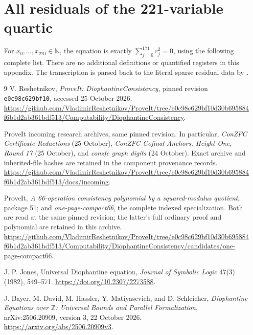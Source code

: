 \documentclass[11pt,letterpaper]{article}
\theoremstyle{remark}\newtheorem{remark}[theorem]{Remark}
\newcommand{\N}{\mathbb N}
\newcommand{\Z}{\mathbb Z}
\newcommand{\file}[1]{\texttt{\small\detokenize{#1}}}
\begin{document}
\begingroup\small

\endgroup

\clearpage
\section{All residuals of the 221-variable quartic}
\label{app:residuals}

For $x_0,\ldots,x_{220}\in\N$, the equation is exactly
$\sum_{j=0}^{171}r_j^2=0$, using the following complete list.
There are no additional definitions or quantified registers in this appendix.
The transcription is parsed back to the literal sparse residual data by
\file{natural/render.py --check}.
\begingroup\small
\setlength{\abovedisplayskip}{4pt}\setlength{\belowdisplayskip}{4pt}

\endgroup

\clearpage
\begin{thebibliography}{9}
V. Reshetnikov, \emph{ProveIt: DiophantineConsistency}, pinned revision
\texttt{e0c98c629bf10}, accessed 25 October 2026.
\url{https://github.com/VladimirReshetnikov/ProveIt/tree/e0c98c629bf10d30b695884f6b1d2ab361bdf513/Computability/DiophantineConsistency}.

ProveIt incoming research archives, same pinned revision. In particular,
\emph{ConZFC Certificate Reductions} (25 October),
\emph{ConZFC Cofinal Anchors, Height One, Round 17} (25 October), and
\emph{conzfc graph digits} (24 October). Exact archive and inherited-file
hashes are retained in the component provenance records.
\url{https://github.com/VladimirReshetnikov/ProveIt/tree/e0c98c629bf10d30b695884f6b1d2ab361bdf513/docs/incoming}.

ProveIt, \emph{A 66-operation consistency polynomial by a squared-modulus
quotient}, package 51; and \emph{one-page-compact66}, the complete indexed
specialization. Both are read at the same pinned revision; the latter's
full ordinary proof and polynomial are retained in this archive.
\url{https://github.com/VladimirReshetnikov/ProveIt/tree/e0c98c629bf10d30b695884f6b1d2ab361bdf513/Computability/DiophantineConsistency/candidates/one-page-compact66}.

J. P. Jones, Universal Diophantine equation, \emph{Journal of Symbolic Logic}
47(3) (1982), 549--571. \url{https://doi.org/10.2307/2273588}.

J. Bayer, M. David, M. Hassler, Y. Matiyasevich, and D. Schleicher,
\emph{Diophantine Equations over $\Z$: Universal Bounds and Parallel
Formalization}, arXiv:2506.20909, version 3, 22 October 2026.
\url{https://arxiv.org/abs/2506.20909v3}.
\end{thebibliography}
\end{document}
